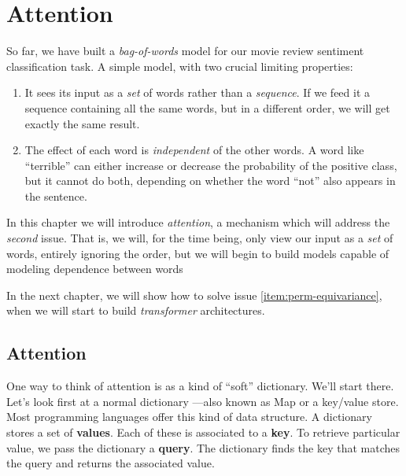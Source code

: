 \documentclass{pca}
\newenvironment{aside}{
	\setlength{\leftskip}{1em}\par\itshape
}{
	
	\setlength{\leftskip}{0em}\par
}
\newcommand{\gc}[1]{{\color{my-green} #1}}
\newcommand{\rc}[1]{{\color{my-red} #1}}
\newcommand{\bc}[1]{{\color{my-blue} #1}}
\theoremstyle{theorem}
\theoremstyle{definition}
\theoremstyle{proof}
\begin{document}

\chapter{Attention}

So far, we have built a \emph{bag-of-words} model for our movie review sentiment classification task. A simple model, with two crucial limiting properties:
\begin{enumerate}
\item It sees its input as a \emph{set} of words rather than a \emph{sequence}. If we feed it a sequence containing all the same words, but in a different order, we will get exactly the same result. \label{item:perm-equivariance}
\item The effect of each word is \emph{independent} of the other words. A word like ``terrible'' can either increase or decrease the probability of the positive class, but it cannot do both, depending on whether the word ``not'' also appears in the sentence. \label{item:independence}
\end{enumerate}

In this chapter we will introduce \emph{attention}, a mechanism which will address the \emph{second} issue. That is, we will, for the time being, only view our input as a \emph{set} of words, entirely ignoring the order, but we will begin to build models capable of modeling dependence between words


\begin{aside}
In the next chapter, we will show how to solve issue \ref{item:perm-equivariance}, when we will start to build \emph{transformer} architectures.
\end{aside}

\section{Attention}

One way to think of attention is as a kind of ``soft'' dictionary. We'll start there. Let's look first at a normal dictionary ---also known as Map or a key/value store. Most programming languages offer this kind of data structure. A dictionary stores a set of \rc{\textbf{values}}. Each  of these is associated to a \gc{\textbf{key}}. To retrieve particular value, we pass the dictionary a \bc{\textbf{query}}. The dictionary finds the key that matches the query and returns the associated value.
\end{document}
